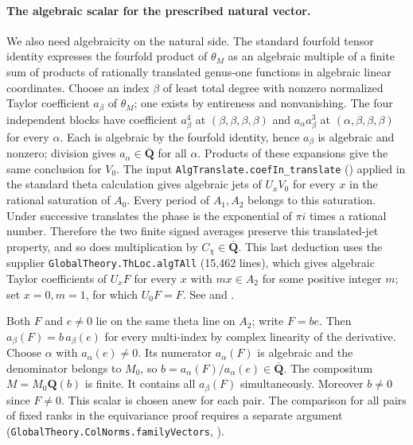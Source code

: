 \paragraph{The algebraic scalar for the prescribed natural vector.}
\label{r14:vec-descent}
We also need algebraicity on the natural side. The standard
fourfold tensor identity expresses the fourfold product of
\(\theta_M\) as an algebraic multiple of a finite sum of products
of rationally translated genus-one functions in algebraic linear
coordinates. Choose an index $\beta$ of least total degree with nonzero
normalized Taylor coefficient $a_\beta$ of $\theta_M$; one exists by
entireness and nonvanishing. The four independent blocks have coefficient
$a_\beta^4$ at $(\beta,\beta,\beta,\beta)$ and $a_\alpha a_\beta^3$
at $(\alpha,\beta,\beta,\beta)$ for every $\alpha$. Each is algebraic by the
fourfold identity, hence $a_\beta$ is algebraic and nonzero; division
gives $a_\alpha\in\overline{\mathbf Q}$ for all $\alpha$. Products of
these expansions give the same conclusion for $V_0$.
The input \nolinkurl{AlgTranslate.coefIn_translate}
() applied in the standard theta
calculation gives
algebraic jets of \(U_x V_0\) for every \(x\) in the rational saturation
of \(A_0\). Every period of \(A_1,A_2\) belongs to this saturation.
Under successive translates the phase is the exponential of \(\pi i\)
times a rational number. Therefore the two finite signed averages
preserve this translated-jet property, and so does multiplication by
\(C_\chi\in\overline{\mathbf Q}\). This last deduction uses the supplier
\nolinkurl{GlobalTheory.ThLoc.algTAll} (15,462 lines), which gives algebraic Taylor
coefficients of \(U_xF\) for every \(x\) with \(m x\in A_2\) for
some positive integer \(m\); set \(x=0,m=1\), for which \(U_0F=F\).
See 
and .

Both \(F\) and \(e\ne0\) lie on the same theta line on \(A_2\);
write \(F=be\). Then \(a_\beta(F)=b\,a_\beta(e)\) for every
multi-index by complex linearity of the derivative. Choose \(\alpha\)
with \(a_\alpha(e)\ne0\). Its numerator \(a_\alpha(F)\) is algebraic
and the denominator belongs to \(M_0\), so
\(b=a_\alpha(F)/a_\alpha(e)\in\overline{\mathbf Q}\).
The compositum \(M=M_0\mathbf Q(b)\) is finite. It contains all
\(a_\beta(F)\) simultaneously. Moreover \(b\ne0\) since \(F\ne0\).
This scalar is chosen anew for each pair. The comparison for all
pairs of fixed ranks in the equivariance proof requires a separate
argument (\nolinkurl{GlobalTheory.ColNorms.familyVectors},
).


